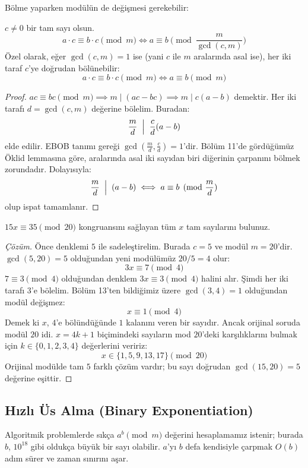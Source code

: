 Bölme yaparken modülün de değişmesi gerekebilir:

\begin{theorem}
$c \ne 0$ bir tam sayı olsun.
\[
a \cdot c \equiv b \cdot c \pmod m \iff a \equiv b \pmod{\frac{m}{\gcd(c, m)}}
\]
Özel olarak, eğer $\gcd(c, m) = 1$ ise (yani $c$ ile $m$ aralarında asal ise), her iki taraf $c$'ye doğrudan bölünebilir:
\[
a \cdot c \equiv b \cdot c \pmod m \iff a \equiv b \pmod m
\]
\end{theorem}

\begin{proof}
$ac \equiv bc \pmod m \implies m \mid (ac - bc) \implies m \mid c(a - b)$ demektir.
Her iki tarafı $d = \gcd(c, m)$ değerine bölelim. Buradan:
\[
\frac{m}{d} \;\Bigm|\; \frac{c}{d}(a - b)
\]
elde edilir. EBOB tanımı gereği $\gcd\left(\frac{m}{d}, \frac{c}{d}\right) = 1$'dir. Bölüm 11'de gördüğümüz Öklid lemmasına göre, aralarında asal iki sayıdan biri diğerinin çarpanını bölmek zorundadır. Dolayısıyla:
\[
\frac{m}{d} \;\Bigm|\; (a - b) \iff a \equiv b \pmod{\frac{m}{d}}
\]
olup ispat tamamlanır.
\end{proof}

\begin{example}
$15x \equiv 35 \pmod{20}$ kongruansını sağlayan tüm $x$ tam sayılarını bulunuz.
\end{example}

\begin{proof}[Çözüm]
Önce denklemi $5$ ile sadeleştirelim. Burada $c = 5$ ve modül $m = 20$'dir.
$\gcd(5, 20) = 5$ olduğundan yeni modülümüz $20 / 5 = 4$ olur:
\[
3x \equiv 7 \pmod 4
\]
$7 \equiv 3 \pmod 4$ olduğundan denklem $3x \equiv 3 \pmod 4$ halini alır.
Şimdi her iki tarafı $3$'e bölelim. Bölüm 13'ten bildiğimiz üzere $\gcd(3, 4) = 1$ olduğundan modül değişmez:
\[
x \equiv 1 \pmod 4
\]
Demek ki $x$, $4$'e bölündüğünde $1$ kalanını veren bir sayıdır. Ancak orijinal soruda modül $20$ idi. $x = 4k + 1$ biçimindeki sayıların mod $20$'deki karşılıklarını bulmak için $k \in \{0, 1, 2, 3, 4\}$ değerlerini veririz:
\[
x \in \{1, 5, 9, 13, 17\} \pmod{20}
\]
Orijinal modülde tam $5$ farklı çözüm vardır; bu sayı doğrudan $\gcd(15, 20) = 5$ değerine eşittir.
\end{proof}

\subsection{Hızlı Üs Alma (Binary Exponentiation)}

Algoritmik problemlerde sıkça $a^b \pmod m$ değerini hesaplamamız istenir; burada $b$, $10^{18}$ gibi oldukça büyük bir sayı olabilir. $a$'yı $b$ defa kendisiyle çarpmak $O(b)$ adım sürer ve zaman sınırını aşar.

